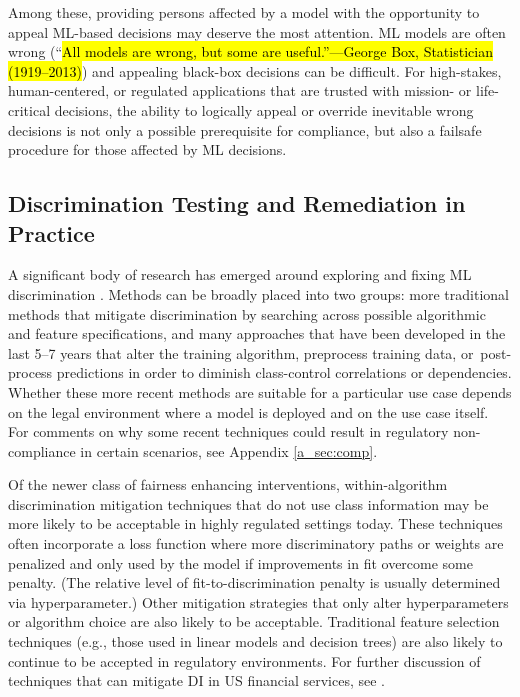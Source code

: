 \documentclass[information,article,accept,moreauthors,pdftex]{Definitions/mdpi}
\begin{document}
{{{ Among these, providing persons affected by a model with the opportunity to appeal ML-based decisions may deserve the most attention. ML models are often wrong ({``\hl{All models are wrong, but some are useful.''---George Box, Statistician (1919--2013)}}) %
 and appealing black-box decisions can be difficult. For high-stakes, human-centered, or regulated applications that are trusted with mission- or life-critical decisions, the ability to logically appeal or override inevitable wrong decisions is not only a possible prerequisite for compliance, but also a failsafe procedure for those affected by ML decisions.  %

\subsection{Discrimination Testing and Remediation in Practice}\label{ssec:disc_rem}

A significant body of research has emerged around exploring and fixing ML discrimination \cite{friedler2019comparative}. Methods can be broadly placed into two groups: more traditional methods that mitigate discrimination by searching across possible algorithmic and feature specifications, and many approaches that have been developed in the last 5--7 years that alter the training algorithm, preprocess training data, or~post-process predictions in order to diminish class-control correlations or dependencies. Whether these more recent methods are suitable for a particular use case depends on the legal environment where a model is deployed and on the use case itself. For comments on why some recent techniques could result in regulatory non-compliance in certain scenarios, see Appendix \ref{a_sec:comp}.

Of the newer class of fairness enhancing interventions, within-algorithm discrimination mitigation techniques that do not use class information may be more likely to be acceptable in highly regulated settings today. These techniques often incorporate a loss function where more discriminatory paths or weights are penalized and only used by the model if improvements in fit overcome some penalty. (The relative level of fit-to-discrimination penalty is usually determined via hyperparameter.) Other mitigation strategies that only alter hyperparameters or algorithm choice are also likely to be acceptable. Traditional feature selection techniques (e.g., those used in linear models and decision trees) are also likely to continue to be accepted in regulatory environments. For further discussion of techniques that can mitigate DI in US financial services, see \citet{schmidt2019introduction}. 

}}}
\end{document}
